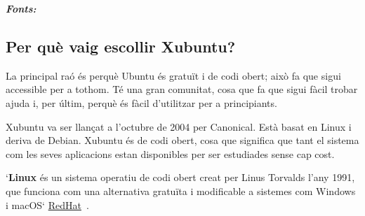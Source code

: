 \textit{\textbf{Fonts:}}~\cite{AS}
%

\subsection*{Per què vaig escollir Xubuntu?}
La principal raó és perquè Ubuntu és gratuït i de codi obert; això fa que sigui accessible per a tothom. Té una gran comunitat, cosa que fa que sigui fàcil trobar ajuda i, per últim, perquè és fàcil d’utilitzar per a principiants.





Xubuntu va ser llançat a l’octubre de 2004 per Canonical. Està basat en Linux i deriva de Debian. Xubuntu és de codi obert, cosa que significa que tant el sistema com les seves aplicacions estan disponibles per ser estudiades sense cap cost.

`\textbf{Linux} és un sistema operatiu de codi obert creat per Linus Torvalds l’any 1991, que funciona com una alternativa gratuïta i modificable a sistemes com Windows i macOS`
\href{https://www.redhat.com/es/topics/linux}{RedHat}~\cite{RH}.

